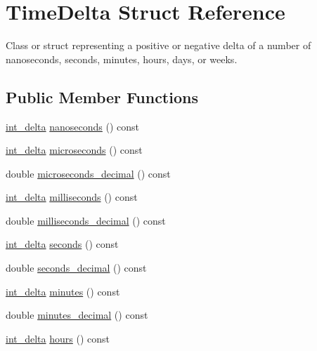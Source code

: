 \hypertarget{structTimeDelta}{\section{\-Time\-Delta \-Struct \-Reference}
\label{structTimeDelta}
}


\-Class or struct representing a positive or negative delta of a number of nanoseconds, seconds, minutes, hours, days, or weeks.  


\subsection*{\-Public \-Member \-Functions}
\begin{DoxyCompactItemize}
\item 
\hyperlink{types_8h_a8a67cf99971c5cfeeaa2380ba84a4c92}{int\-\_\-delta} \hyperlink{structTimeDelta_a27608357ea9addd1d0da20918f91d500}{nanoseconds} () const 
\item 
\hyperlink{types_8h_a8a67cf99971c5cfeeaa2380ba84a4c92}{int\-\_\-delta} \hyperlink{structTimeDelta_aa23b22a3b2a0f3f559e9dc343588b546}{microseconds} () const 
\item 
double \hyperlink{structTimeDelta_a44f7ddea28b3ca359d4cc3b1907fdf00}{microseconds\-\_\-decimal} () const 
\item 
\hyperlink{types_8h_a8a67cf99971c5cfeeaa2380ba84a4c92}{int\-\_\-delta} \hyperlink{structTimeDelta_a185b2278844ed43b2f5e1e8d16b11cb2}{milliseconds} () const 
\item 
double \hyperlink{structTimeDelta_a60a0277bc5fed5605850e4de83d4e50d}{milliseconds\-\_\-decimal} () const 
\item 
\hyperlink{types_8h_a8a67cf99971c5cfeeaa2380ba84a4c92}{int\-\_\-delta} \hyperlink{structTimeDelta_aa1fe6d8a690ab04b561400c09db673ef}{seconds} () const 
\item 
double \hyperlink{structTimeDelta_a19679d7e3057197bc7844b27f0b20cfb}{seconds\-\_\-decimal} () const 
\item 
\hyperlink{types_8h_a8a67cf99971c5cfeeaa2380ba84a4c92}{int\-\_\-delta} \hyperlink{structTimeDelta_a2856a4e761fc83822cc6987655035e76}{minutes} () const 
\item 
double \hyperlink{structTimeDelta_adcf5fed9ca5f425246658f252082806f}{minutes\-\_\-decimal} () const 
\item 
\hyperlink{types_8h_a8a67cf99971c5cfeeaa2380ba84a4c92}{int\-\_\-delta} \hyperlink{structTimeDelta_a5135596cbf7f7ef40001e25c5aa880b3}{hours} () const 
\item 

\end{DoxyCompactItemize}
